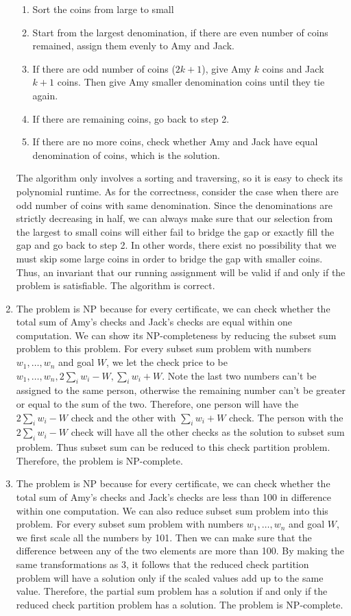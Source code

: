 \begin{exercise}[]
\begin{solution}
\begin{enumerate}
\begin{enumerate}
      \item Sort the coins from large to small
      \item Start from the largest denomination, if there are even number of coins remained, assign them evenly to Amy and Jack. 
      \item If there are odd number of coins ($2k+1$), give Amy $k$ coins and Jack $k+1$ coins. Then give Amy smaller denomination coins until they tie again.
      \item If there are remaining coins, go back to step 2.
      \item If there are no more coins, check whether Amy and Jack have equal denomination of coins, which is the solution.
    \end{enumerate}
    The algorithm only involves a sorting and traversing, so it is easy to check its polynomial runtime. As for the correctness, consider the case when there are odd number of coins with same denomination. Since the denominations are strictly decreasing in half, we can always make sure that our selection from the largest to small coins will either fail to bridge the gap or exactly fill the gap and go back to step 2. In other words, there exist no possibility that we must skip some large coins in order to bridge the gap with smaller coins. Thus, an invariant that our running assignment will be valid if and only if the problem is satisfiable. The algorithm is correct.
    \item The problem is NP because for every certificate, we can check whether the total sum of Amy's checks and Jack's checks are equal within one computation. We can show its NP-completeness by reducing the subset sum problem to this problem. For every subset sum problem with numbers $w_1,\ldots,w_n$ and goal $W$, we let the check price to be $w_1,\ldots,w_n,2\sum_{i}w_i - W, \sum_i{w_i} + W$.  Note the last two numbers can't be assigned to the same person, otherwise the remaining number can't be greater or equal to the sum of the two. Therefore, one person will have the $2\sum_{i}w_i - W$ check and the other with $\sum_i{w_i} + W$ check. The person with the $2\sum_{i}w_i - W$ check will have all the other checks as the solution to subset sum problem. Thus subset sum can be reduced to this check partition problem. Therefore, the problem is NP-complete.
    \item The problem is NP because for every certificate, we can check whether the total sum of Amy's checks and Jack's checks are less than 100 in difference within one computation. We can also reduce subset sum problem into this problem. For every subset sum problem with numbers $w_1,\ldots,w_n$ and goal $W$, we first scale all the numbers by 101. Then we can make sure that the difference between any of the two elements are more than 100. By making the same transformations as 3, it follows that the reduced check partition problem will have a solution only if the scaled values add up to the same value. Therefore, the partial sum problem has a solution if and only if the reduced check partition problem has a solution. The problem is NP-complete.

\end{enumerate}
\end{solution}
\end{exercise}

